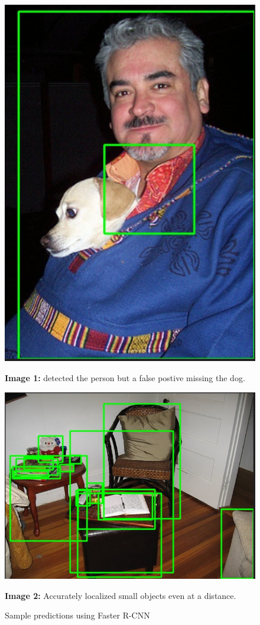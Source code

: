 \documentclass[12pt]{article}
\begin{document}
\begin{figure}[H]
    \centering
    \begin{minipage}[b]{0.45\textwidth}
        \includegraphics[width=\textwidth]{rcnn_result1.png}
        \caption*{\textbf{Image 1:} detected the person but a false postive missing the dog.}
    \end{minipage}
    \hfill
    \begin{minipage}[b]{0.45\textwidth}
        \includegraphics[width=\textwidth]{rcnn_result2.png}
        \caption*{\textbf{Image 2:} Accurately localized small objects even at a distance.}
    \end{minipage}
    \caption{Sample predictions using Faster R-CNN}
\end{figure}
\end{document}
